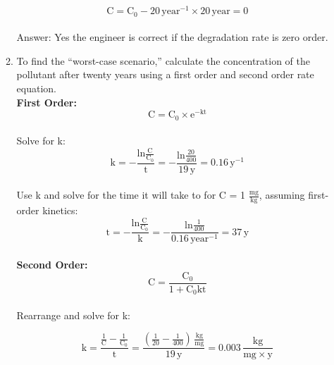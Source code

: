 \documentclass[12pt,letterpaper]{article}
\begin{document}
\begin{enumerate}
\begin{enumerate}
\begin{equation*}
\mathrm{C = C_0 -20\, year^{-1}\times 20 \, year = 0}
\end{equation*}\\



Answer: Yes the engineer is correct if the degradation rate is zero order.

\item To find the ``worst-case scenario,'' calculate the concentration of the pollutant after twenty years using a first order and second order rate equation.\\

\textbf{First Order:}\\

\begin{equation*}
\mathrm{C = C_0\times e^{-kt}}
\end{equation*}\\

Solve for k:\\

\begin{equation*}
\mathrm{k = -\frac{ln\frac{C}{C_0}}{t} = -\frac{ln\frac{20}{400}}{19\, y} = 0.16 \, y^{-1}}
\end{equation*}\\

Use k and solve for the time it will take to for C = 1 $\mathrm{\frac{mg}{kg}}$, assuming first-order kinetics:\\

\begin{equation*}
\mathrm{t = -\frac{ln\frac{C}{C_0}}{k} = -\frac{ln\frac{1}{400}}{0.16\, year^{-1}} = 37 \, y}
\end{equation*}\\

\textbf{Second Order:}\\

\begin{equation*}
\mathrm{C = \frac{C_0}{1 + C_0kt}}
\end{equation*}\\

Rearrange and solve for k:

\begin{equation*}
\mathrm{k = \frac{\frac{1}{C}-\frac{1}{C_0}}{t} = \frac{(\frac{1}{20}-\frac{1}{400})\, \frac{kg}{mg}}{19\, y} = 0.003\, \frac{kg}{mg\times y}}
\end{equation*}\\


\end{enumerate}
\end{enumerate}
\end{document}
